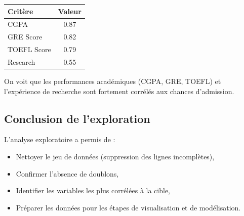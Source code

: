 \begin{tabular}{|l|c|}
\hline
Critère & Valeur \\ 
\hline
CGPA & 0.87 \\ 
GRE Score & 0.82 \\ 
TOEFL Score & 0.79 \\ 
Research & 0.55 \\ 
\hline
\end{tabular}

On voit que les performances académiques (CGPA, GRE, TOEFL) et l'expérience de recherche sont fortement corrélés aux chances d'admission.

\subsection{Conclusion de l'exploration}

L'analyse exploratoire a permis de :
\begin{itemize}
    \item Nettoyer le jeu de données (suppression des lignes incomplètes),
    \item Confirmer l'absence de doublons,
    \item Identifier les variables les plus corrélées à la cible,
    \item Préparer les données pour les étapes de visualisation et de modélisation.
\end{itemize}
